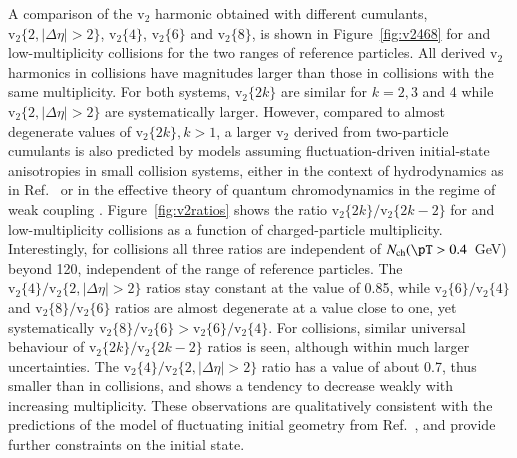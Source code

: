 \documentclass[cernpreprint,texlive=2014,txfonts,UKenglish]{latex/atlasdoc}
\begin{document}
A comparison of the $\mathrm{v}_2$ harmonic obtained with different cumulants, $\mathrm{v}_2\{2,|\Delta\eta| > 2\}$,
$\mathrm{v}_2\{4\}$, $\mathrm{v}_2\{6\}$ and $\mathrm{v}_2\{8\}$, is shown in Figure~\ref{fig:v2468} for \pPb and low-multiplicity \PbPb collisions for the two \pT ranges of reference particles. All derived $\mathrm{v}_2$ harmonics in \PbPb collisions have magnitudes larger than those in \pPb collisions with the same multiplicity. For both systems, $\mathrm{v}_2\{2k\}$ are similar for $k= 2, 3$ and 4 while $\mathrm{v}_2\{2,|\Delta\eta| > 2\}$ are systematically larger. 
However, compared to almost degenerate values of $\mathrm{v}_2\{2k\}, k>1$, a larger $\mathrm{v}_2$ derived from two-particle cumulants is also predicted by models assuming fluctuation-driven initial-state anisotropies in small collision systems, either in the context of hydrodynamics as in Ref.~\cite{v468Ollitrault} or in the effective theory of quantum chromodynamics in the regime of weak coupling \cite{bzdak1,bzdak2}. Figure~\ref{fig:v2ratios} shows the ratio $\mathrm{v}_2\{2k\}/\mathrm{v}_2\{2k-2\}$ for \pPb and low-multiplicity \PbPb collisions as a function of charged-particle multiplicity. Interestingly, for \PbPb collisions all three ratios are independent of $N_{\mathrm{ch}}(\pT > 0.4$~GeV)  beyond 120, independent of the \pT range of reference particles. The $\mathrm{v}_2\{4\}/\mathrm{v}_2\{2,|\Delta\eta| > 2\}$ ratios stay constant at the value of 0.85, while 
$\mathrm{v}_2\{6\}/\mathrm{v}_2\{4\}$ and $\mathrm{v}_2\{8\}/\mathrm{v}_2\{6\}$ ratios are almost degenerate at a value close to one, yet systematically $\mathrm{v}_2\{8\}/\mathrm{v}_2\{6\} > \mathrm{v}_2\{6\}/\mathrm{v}_2\{4\}$. For \pPb collisions, similar universal behaviour of $\mathrm{v}_2\{2k\}/\mathrm{v}_2\{2k-2\}$ ratios is seen, although within much larger uncertainties. The $\mathrm{v}_2\{4\}/\mathrm{v}_2\{2,|\Delta\eta| > 2\}$ ratio has a value of about 0.7, thus smaller than in \PbPb collisions, and shows a tendency to decrease weakly with increasing multiplicity. These observations are qualitatively consistent with the predictions of the model of fluctuating initial geometry from Ref.~\cite{v468Ollitrault}, and provide further constraints on the initial state. 
\end{document}
